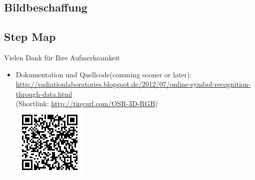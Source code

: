 \documentclass{VLKlauck}
\begin{document}
	\subsection{Bildbeschaffung}
	\subsection{Step Map} 
	  
	\begin{frame}{Vielen Dank für Ihre Aufmerksamkeit}
	    \begin{itemize}
	      \item Dokumentation und Quellcode(comming sooner or later):\\
	      {\small\url{http://radiationlaboratories.blogspot.de/2012/07/online-symbol-recognition-through-data.html}}\\
	       (Shortlink: \url{http://tinyurl.com/OSR-3D-RGB})\\ \includegraphics[scale=1]{qrLink.png}
	       
	    \end{itemize}
	\end{frame} 
\end{document}
